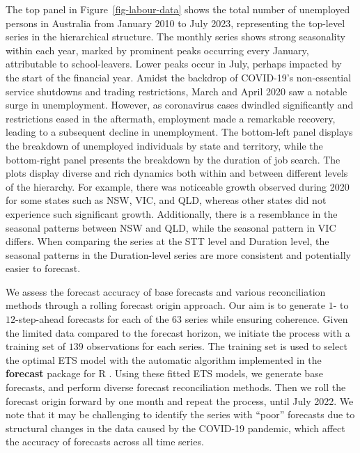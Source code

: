 \documentclass[
  11pt]{article}
\theoremstyle{plain}
\theoremstyle{remark}
\begin{document}
The top panel in Figure~\ref{fig-labour-data} shows the total number of
unemployed persons in Australia from January 2010 to July 2023,
representing the top-level series in the hierarchical structure. The
monthly series shows strong seasonality within each year, marked by
prominent peaks occurring every January, attributable to school-leavers.
Lower peaks occur in July, perhaps impacted by the start of the
financial year. Amidst the backdrop of COVID-19's non-essential service
shutdowns and trading restrictions, March and April 2020 saw a notable
surge in unemployment. However, as coronavirus cases dwindled
significantly and restrictions eased in the aftermath, employment made a
remarkable recovery, leading to a subsequent decline in unemployment.
The bottom-left panel displays the breakdown of unemployed individuals
by state and territory, while the bottom-right panel presents the
breakdown by the duration of job search. The plots display diverse and
rich dynamics both within and between different levels of the hierarchy.
For example, there was noticeable growth observed during 2020 for some
states such as NSW, VIC, and QLD, whereas other states did not
experience such significant growth. Additionally, there is a resemblance
in the seasonal patterns between NSW and QLD, while the seasonal pattern
in VIC differs. When comparing the series at the STT level and Duration
level, the seasonal patterns in the Duration-level series are more
consistent and potentially easier to forecast.

We assess the forecast accuracy of base forecasts and various
reconciliation methods through a rolling forecast origin approach. Our
aim is to generate \(1\)- to \(12\)-step-ahead forecasts for each of the
\(63\) series while ensuring coherence. Given the limited data compared
to the forecast horizon, we initiate the process with a training set of
\(139\) observations for each series. The training set is used to select
the optimal ETS model with the automatic algorithm implemented in the
\textbf{forecast} package for R \citep{HK08}. Using these fitted ETS
models, we generate base forecasts, and perform diverse forecast
reconciliation methods. Then we roll the forecast origin forward by one
month and repeat the process, until July 2022. We note that it may be
challenging to identify the series with ``poor'' forecasts due to
structural changes in the data caused by the COVID-19 pandemic, which
affect the accuracy of forecasts across all time series.
\end{document}
